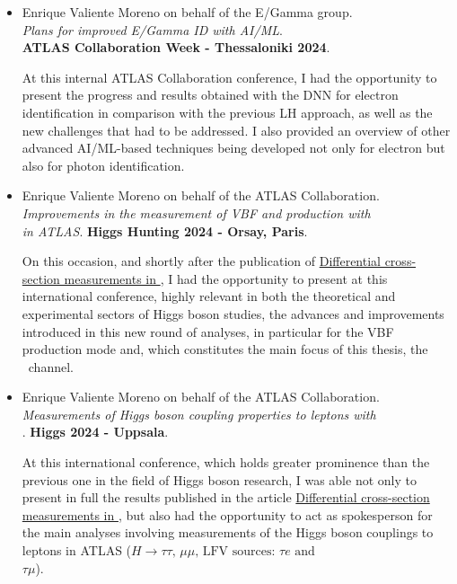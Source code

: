 \begin{itemize}
    \item Enrique Valiente Moreno on behalf of the E/Gamma group.\\ \textit{Plans for improved E/Gamma ID with AI/ML}.\\ 
    \textbf{ATLAS Collaboration Week - Thessaloniki 2024}.

    At this internal ATLAS Collaboration conference, I had the opportunity to present the progress and results obtained with the DNN for electron identification in comparison with the previous LH approach, as well as the new challenges that had to be addressed. I also provided an overview of other advanced AI/ML-based techniques being developed not only for electron but also for photon identification.

    \item Enrique Valiente Moreno on behalf of the ATLAS Collaboration.\\ \textit{Improvements in the measurement of VBF and \ttH production with} \\ \textit{\htautau in ATLAS}. 
    \textbf{Higgs Hunting 2024 - Orsay, Paris}.

    On this occasion, and shortly after the publication of \href{https://link.springer.com/article/10.1007/JHEP03(2025)010}{Differential cross-section measurements in \htautau}, I had the opportunity to present at this international conference, highly relevant in both the theoretical and experimental sectors of Higgs boson studies, the advances and improvements introduced in this new round of analyses, in particular for the VBF production mode and, which constitutes the main focus of this thesis, the \ttH\ channel.

    \item Enrique Valiente Moreno on behalf of the ATLAS Collaboration.\\ \textit{Measurements of Higgs boson coupling properties to leptons with}\\ . 
    \textbf{Higgs 2024 - Uppsala}.

    At this international conference, which holds greater prominence than the previous one in the field of Higgs boson research, I was able not only to present in full the results published in the article \href{https://link.springer.com/article/10.1007/JHEP03(2025)010}{Differential cross-section measurements in \htautau}, but also had the opportunity to act as spokesperson for the main analyses involving measurements of the Higgs boson couplings to leptons in ATLAS ($H\to\tau\tau,\, \mu\mu,\, \text{LFV sources: } \tau e \text{ and }$\\ $\tau\mu$).

\end{itemize}

